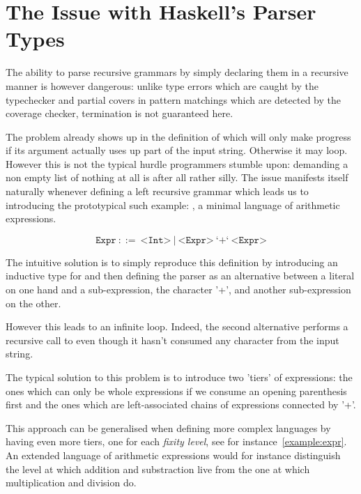 \section{The Issue with Haskell's Parser Types}\label{sec:haskellproblem}

The ability to parse recursive grammars by simply declaring
them in a recursive manner is however dangerous: unlike type
errors which are caught by the typechecker and partial covers
in pattern matchings which are detected by the coverage checker,
termination is not guaranteed here.

The problem already shows up in the definition of 
which will only make progress if its argument actually uses up
part of the input string. Otherwise it may loop. However this
is not the typical hurdle programmers stumble upon: demanding
a non empty list of nothing at all is after all rather silly.
The issue manifests itself naturally whenever defining a left
recursive grammar which leads us to introducing the prototypical
such example: , a minimal language of arithmetic
expressions.

\[
\texttt{Expr} ~::=~ \texttt{<Int>} ~|~ \texttt{<Expr>} ~\text{`+`}~ \texttt{<Expr>}
\]

The intuitive solution is to simply reproduce this definition by
introducing an inductive type for  and then defining
the parser as an alternative between a literal on one hand and a
sub-expression, the character '+', and another sub-expression on
the other.


However this leads to an infinite loop. Indeed, the second
alternative performs a recursive call to  even
though it hasn't consumed any character from the input string.

The typical solution to this problem is to introduce two 'tiers'
of expressions: the  ones which can only be whole
expressions if we consume an opening parenthesis first and the
 ones which are left-associated chains of 
expressions connected by '+'.\label{parser:expr}


This approach can be generalised when defining more complex
languages by having even more tiers, one for each
\emph{fixity level}\label{fixity}, see for instance~\ref{example:expr}.
An extended language of arithmetic expressions would for
instance distinguish the level at which addition and
substraction live from the one at which multiplication and
division do.


